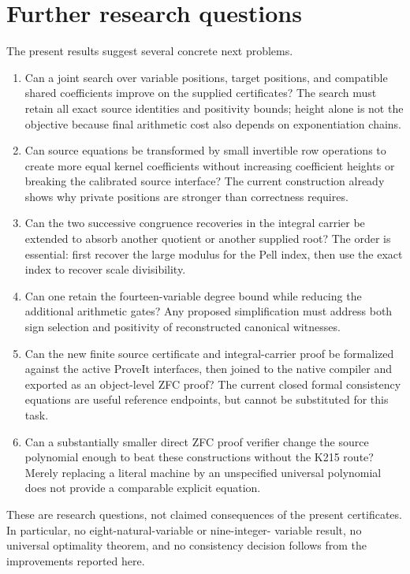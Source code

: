 \documentclass[11pt,a4paper]{article}
\theoremstyle{definition}\newtheorem{definition}[theorem]{Definition}
\theoremstyle{remark}\newtheorem{remark}[theorem]{Remark}
\begin{document}






\section{Further research questions}
\label{sec:future}
The present results suggest several concrete next problems.
\begin{enumerate}
\item Can a joint search over variable positions, target positions, and
compatible shared coefficients improve on the supplied certificates?
The search must retain all exact source identities and positivity bounds;
height alone is not the objective because final arithmetic cost also
depends on exponentiation chains.
\item Can source equations be transformed by small invertible row
operations to create more equal kernel coefficients without increasing
coefficient heights or breaking the calibrated source interface?
The current construction already shows why private positions are stronger
than correctness requires.
\item Can the two successive congruence recoveries in the integral
carrier be extended to absorb another quotient or another supplied root?
The order is essential: first recover the large modulus for the Pell
index, then use the exact index to recover scale divisibility.
\item Can one retain the fourteen-variable degree bound while reducing
the additional arithmetic gates? Any proposed simplification must address
both sign selection and positivity of reconstructed canonical witnesses.
\item Can the new finite source certificate and integral-carrier proof
be formalized against the active ProveIt interfaces, then joined to the
native compiler and exported as an object-level ZFC proof?
The current closed formal consistency equations are useful reference
endpoints, but cannot be substituted for this task.
\item Can a substantially smaller direct ZFC proof verifier change the
source polynomial enough to beat these constructions without the K215
route? Merely replacing a literal machine by an unspecified universal
polynomial does not provide a comparable explicit equation.
\end{enumerate}

These are research questions, not claimed consequences of the present
certificates. In particular, no eight-natural-variable or nine-integer-
variable result, no universal optimality theorem, and no consistency
decision follows from the improvements reported here.
\end{document}
